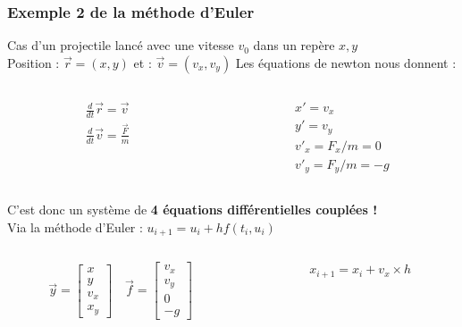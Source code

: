 \documentclass{beamer}
\begin{document}
\begin{frame}
\frametitle{Exemple 2 de la méthode d'Euler}
\small
\vspace{-0.4cm}
Cas d'un projectile lancé avec une vitesse $v_0$ dans un repère $x,y$\\
\vspace{0.1cm}
Position : $\vec{r} = (x,y)$ \hspace{0.4cm} et : $\vec{v} = (v_x, v_y)$
Les équations de newton nous donnent :
\begin{columns}[t]
\begin{column}{0.4\textwidth}
\begin{align*}
& \frac{d}{dt}\vec{r} = \vec{v} \\ 
& \frac{d}{dt}\vec{v} = \frac{\vec{F}}{m}
\end{align*}
\end{column}
%
\begin{column}{0.4\textwidth}
\begin{align*}
& x' = v_x \\
& y' = v_y \\
& v'_x = F_x/m = 0 \\
& v'_y = F_y/m = -g
\end{align*}
\end{column}
\end{columns}
C'est donc un système de \textbf{4 équations différentielles couplées !}\\
Via la méthode d'Euler : $u_{i+1} = u_i + hf(t_i,u_i)$
\vspace{-0.5cm}
\begin{columns}[t]
\begin{column}{0.4\textwidth}
\begin{equation*}
\vec{y} = 
\begin{bmatrix}
x \\
y \\
v_x \\
x_y
\end{bmatrix}
\quad
\vec{f} = 
\begin{bmatrix}
v_x \\
v_y \\
0 \\
-g
\end{bmatrix}
\end{equation*}
\end{column}
%
\begin{column}{0.4\textwidth}
\begin{align*}
& x_{i+1} = x_i + v_x\times h\\

\end{align*}
\end{column}
\end{columns}
\end{frame}
\end{document}

